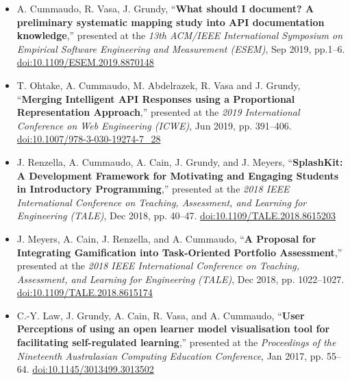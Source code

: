 {\begin{itemize}
  \item A. Cummaudo, R. Vasa, J. Grundy, ``\textbf{What should I document? A preliminary systematic mapping study into API documentation knowledge},'' presented at the \textit{13th ACM/IEEE International Symposium on Empirical Software Engineering and Measurement (ESEM)}, Sep 2019, pp.1--6. \href{https://doi.org/10.1109/ESEM.2019.8870148}{doi:10.1109/ESEM.2019.8870148}\\
  \item T. Ohtake, A. Cummaudo, M. Abdelrazek, R. Vasa and J. Grundy, ``\textbf{Merging Intelligent API Responses using a Proportional Representation Approach},'' presented at the \textit{2019 International Conference on Web Engineering (ICWE)}, Jun 2019, pp. 391--406. \href{https://doi.org/10.1007/978-3-030-19274-7_28}{doi:10.1007/978-3-030-19274-7\_28}\\
  \item J. Renzella, A. Cummaudo, A. Cain, J. Grundy, and J. Meyers, ``\textbf{SplashKit: A Development Framework for Motivating and Engaging Students in Introductory Programming},'' presented at the \textit{2018 IEEE International Conference on Teaching, Assessment, and Learning for Engineering (TALE)}, Dec 2018, pp. 40--47. \href{http://doi.org/10.1109/TALE.2018.8615203}{doi:10.1109/TALE.2018.8615203}\\
  \item J. Meyers, A. Cain, J. Renzella, and A. Cummaudo, ``\textbf{A Proposal for Integrating Gamification into Task-Oriented Portfolio Assessment},'' presented at the \textit{2018 IEEE International Conference on Teaching, Assessment, and Learning for Engineering (TALE)}, Dec 2018, pp. 1022--1027. \href{http://doi.org/10.1109/TALE.2018.8615174}{doi:10.1109/TALE.2018.8615174}\\
  \item C.-Y. Law, J. Grundy, A. Cain, R. Vasa, and A. Cummaudo, ``\textbf{User Perceptions of using an open learner model visualisation tool for facilitating self-regulated learning},'' presented at the \textit{Proceedings of the Nineteenth Australasian Computing Education Conference}, Jan 2017, pp. 55--64. \href{http://doi.org/10.1145/3013499.3013502}{doi:10.1145/3013499.3013502}
\end{itemize}
}

%
%
%  
